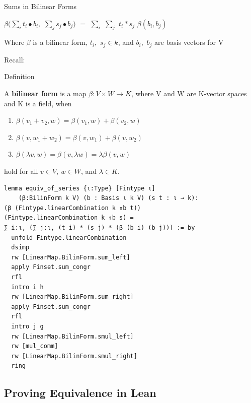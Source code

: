 \documentclass[svgnames]{beamer}
\begin{document}
\begin{frame}{Sums in Bilinear Forms}
\begin{Lemma}
$\beta (\sum\limits_{i} t_i \bullet b_i ,$ $\sum\limits_{j} s_j \bullet b_j)$ $=$ $\sum\limits_{i}$ $\sum\limits_{j}$ $t_i*s_j$ $\beta (b_i , b_j)$
\end{Lemma}
{\footnotesize
Where $\beta$ is a bilinear form, $t_i,$ $s_j \in k$, and $b_i,$ $b_j$ are basis vectors for V
}
\pause
\item Recall:
\begin{block}{Definition}
{\footnotesize
A \textbf {bilinear form} is a map $\beta : V\times W \to K $, where V and W are K-vector spaces and K is a field, when
\begin{enumerate}
    \item $\beta (v_1 + v_2 , w) = \beta (v_1 , w) +\beta ( v_2,w)$
    \item $\beta ( v, w_1 + w_2) = \beta (v,w_1) +\beta (v , w_2)$
    \item $\beta(\lambda v, w) = \beta (v, \lambda w) = \lambda \beta (v , w)$
\end{enumerate}
hold for all $v\in V$, $w\in W$, and $\lambda \in K$.
}
\end{block}
\end{frame}

{\footnotesize
\begin{verbatim}
lemma equiv_of_series {ι:Type} [Fintype ι] 
    (β:BilinForm k V) (b : Basis ι k V) (s t : ι → k): 
(β (Fintype.linearCombination k ⇑b t)) 
(Fintype.linearCombination k ⇑b s) =
∑ i:ι, (∑ j:ι, (t i) * (s j) * (β (b i) (b j))) := by
  unfold Fintype.linearCombination
  dsimp
  rw [LinearMap.BilinForm.sum_left]
  apply Finset.sum_congr
  rfl
  intro i h
  rw [LinearMap.BilinForm.sum_right]
  apply Finset.sum_congr
  rfl
  intro j g
  rw [LinearMap.BilinForm.smul_left]
  rw [mul_comm]
  rw [LinearMap.BilinForm.smul_right]
  ring
\end{verbatim}
}

\subsection{Proving Equivalence in Lean}

\end{document}
